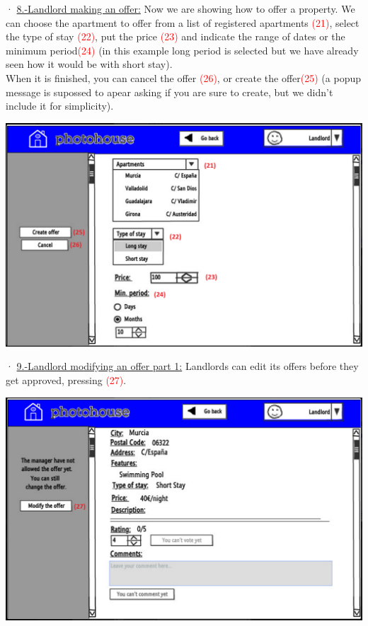 \documentclass[12pt]{article}
\begin{document}
{· \underline{8.-Landlord making an offer:} Now we are showing how to offer a property. We can choose the apartment to offer from a list of registered apartments \textcolor{red}{(21)}, select the type of stay \textcolor{red}{(22)}, put the price \textcolor{red}{(23)} and indicate the range of dates or the minimum period\textcolor{red}{(24)} (in this example long period is selected but we have already seen how it would be with short stay).\\ When it is finished, you can cancel the offer \textcolor{red}{(26)}, or create the offer\textcolor{red}{(25)} (a popup message is supossed to apear asking if you are sure to create, but we didn't include it for simplicity).
\begin{center}
	\includegraphics[scale=.7]{landlord_offering.PNG}
\end{center}


· \underline{9.-Landlord modifying an offer part 1:} Landlords can edit its offers before they get approved, pressing \textcolor{red}{(27)}.
\begin{center}
	\includegraphics[scale=.7]{landlord_editing.PNG}
\end{center}


}
\end{document}
